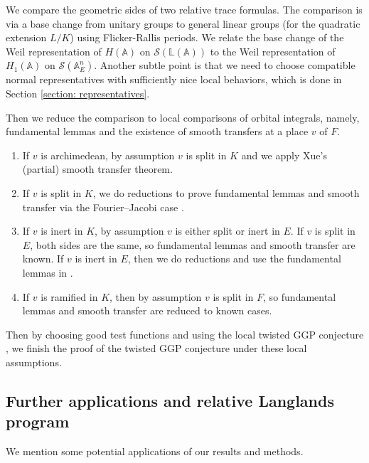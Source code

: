 \documentclass[11pt, reqno]{amsart}
\numberwithin{equation}{subsection}
\theoremstyle{plain}
\theoremstyle{definition}
\newcommand{\BL}{\mathbb L}
\newcommand{\CS}{\mathcal{S}}
\begin{document}
We compare the geometric sides of two relative trace formulas. The comparison is via a base change from unitary groups to general linear groups (for the quadratic extension $L/K$) using Flicker-Rallis periods. We relate the base change of the Weil representation of $H(\mathbb A)$ on $\CS(\BL(\mathbb A))$ to the Weil representation of $H_1(\mathbb A)$ on $\CS(\mathbb A_E^n)$. Another subtle point is that we need to choose compatible normal representatives with sufficiently nice local behaviors, which is done in Section \ref{section: representatives}. 

Then we reduce the comparison to local comparisons of orbital integrals, namely, fundamental lemmas and the existence of smooth transfers at a place $v$ of $F$. 
\begin{enumerate}
\item If $v$ is archimedean, by assumption $v$ is split in $K$ and we apply Xue's     (partial) smooth transfer theorem.
\item If $v$ is split in $K$, we do reductions to prove fundamental lemmas and smooth transfer via the Fourier--Jacobi case \cite{Xue-GGP}. 
\item If $v$ is inert in $K$, by assumption $v$ is either split or inert in $E$. If $v$ is split in $E$, both sides are the same, so fundamental lemmas and smooth transfer are known. If $v$ is inert in $E$, then we do reductions and use the fundamental lemmas in \cite{TGGP-Wang}.
\item If $v$ is ramified in $K$, then by assumption $v$ is split in $F$, so fundamental lemmas and smooth transfer are reduced to known cases.
\end{enumerate}

Then by choosing good test functions and using the local twisted GGP conjecture \cite{le2025local}, we finish the proof of the twisted GGP conjecture under these local assumptions. 




\subsection{Further applications and relative Langlands program}

We mention some potential applications of our results and methods.
\end{document}

